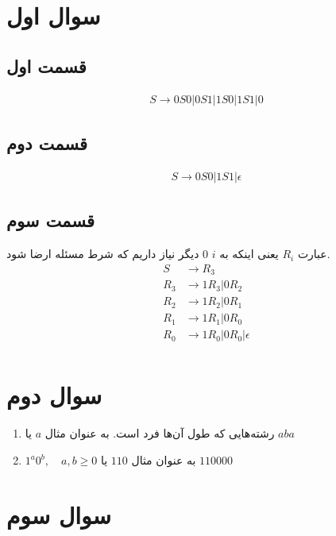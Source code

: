 \documentclass[]{article}
\begin{document}
\printheader

\section*{سوال اول}
\subsection*{قسمت اول}
\begin{gather*}
    S \rightarrow 0S0 | 0S1 | 1S0 | 1S1 | 0
\end{gather*}
\subsection*{قسمت دوم}
\begin{gather*}
    S \rightarrow 0S0 | 1S1 | \epsilon
\end{gather*}
\subsection*{قسمت سوم}
عبارت
$R_i$
یعنی اینکه به
$i$
0 دیگر نیاز داریم
که شرط مسئله ارضا شود.
\begin{align*}
    S &\rightarrow R_3\\
    R_3 &\rightarrow 1R_3 | 0R_2\\
    R_2 &\rightarrow 1R_2 | 0R_1\\
    R_1 &\rightarrow 1R_1 | 0R_0\\
    R_0 &\rightarrow 1R_0 | 0R_0 | \epsilon\\
\end{align*}
\section*{سوال دوم}
\begin{enumerate}
    \item رشته‌هایی که طول آن‌ها فرد است. به عنوان مثال $a$ یا $aba$
    \item $1^a 0^b, \quad a, b \ge 0$ به عنوان مثال $110$ یا $110000$
\end{enumerate}
\section*{سوال سوم}
\end{document}
